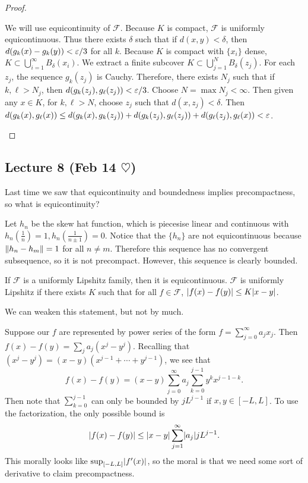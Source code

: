 \documentclass[10pt, twoside]{article}
\begin{document}
\begin{thm}
\begin{proof}
\begin{enumerate}
                We will use equicontinuity of $\mathcal{F}$. Because $K$ is compact, $\mathcal{F}$ is uniformly equicontinuous. Thus there exists $\delta$ such that if $d(x,y) < \delta$, then $d(g_k(x) - g_k(y)) < \varepsilon/3$ for all $k$. Because $K$ is compact with $\{x_i\}$ dense, $K \subset \bigcup_{i=1}^{\infty} B_{\delta}(x_i)$. We extract a finite subcover $K \subset \bigcup_{j=1}^N B_{\delta}(z_j)$. For each $z_j$, the sequence $g_k(z_j)$ is Cauchy. Therefore, there exists $N_j$ such that if $k,\ell > N_j$, then $d(g_k(z_j), g_{\ell}(z_j)) < \varepsilon/3$. Choose $N = \max N_j < \infty$. Then given any $x \in K$, for $k,\ell > N$, choose $z_j$ such that $d(x, z_j) < \delta$. Then $d(g_k(x), g_{\ell}(x)) \leq d(g_k(x), g_k(z_j)) + d(g_k(z_j), g_{\ell}(z_j)) + d(g_{\ell}(z_j), g_{\ell}(x)) < \varepsilon$. \qedhere
            \end{enumerate}
        \end{proof}
    \end{thm}

    \subsection{Lecture 8 (Feb 14 $\heartsuit$)}
    Last time we saw that equicontinuity and boundedness implies precompactness, so what is equicontinuity?

    \begin{exm}
        Let $h_n$ be the skew hat function, which is piecesise linear and continuous with $h_n(\frac{1}{n}) = 1, h_n(\frac{1}{n \pm 1}) = 0$. Notice that the $\{h_n\}$ are not equicontinuous because $\lVert h_n - h_m\rVert = 1$ for all $n \neq m$. Therefore this sequence has no convergent subsequence, so it is not precompact. However, this sequence is clearly bounded.
    \end{exm}

    \begin{exm}
        If $\mathcal{F}$ is a uniformly Lipshitz family, then it is equicontinuous. $\mathcal{F}$ is uniformly Lipshitz if there exists $K$ such that for all $f \in \mathcal{F}$, $\lvert f(x) - f(y)\rvert \leq K\lvert x-y\rvert$.
    \end{exm}

    We can weaken this statement, but not by much.

    \begin{exm}
        Suppose our $f$ are represented by power series of the form $f = \sum_{j=0}^{\infty} a_jx_j$. Then $f(x)-f(y) = \sum_j a_j(x^j-y^j)$. Recalling that $(x^j - y^j) = (x-y)(x^{j-1} + \cdots + y^{j-1})$, we see that \[f(x) - f(y) = (x-y) \sum_{j=0}^{\infty} a_j \sum_{k=0}^{j-1} y^kx^{j-1-k}.\] Then note that $\sum_{k=0}^{j-1}$ can only be bounded by $jL^{j-1}$ if $x,y \in [-L,L]$. To use the factorization, the only possible bound is \[\lvert f(x) - f(y)\rvert \leq \lvert x-y\rvert\sum_{j=1}^{\infty} \lvert a_j\rvert jL^{j-1}.\] This morally looks like $\sup_{[-L,L]} \lvert f'(x)\rvert$, so the moral is that we need some sort of derivative to claim precompactness.
    \end{exm}
\end{document}
